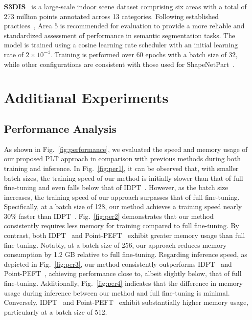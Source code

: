 \textbf{S3DIS}~\cite{armeni20163d} is a large-scale indoor scene dataset comprising six areas with a total of 273 million points annotated across 13 categories. Following established practices~\cite{dong2022autoencoders}, Area 5 is recommended for evaluation to provide a more reliable and standardized assessment of performance in semantic segmentation tasks. The model is trained using a cosine learning rate scheduler with an initial learning rate of $2 \times 10^{-4}$. Training is performed over 60 epochs with a batch size of 32, while other configurations are consistent with those used for ShapeNetPart~\cite{yi2016scalable}.


\section{Additianal Experiments}

\subsection{Performance Analysis}  
As shown in Fig.~\ref{fig:performance}, we evaluated the speed and memory usage of our proposed PLT approach in comparison with previous methods during both training and inference. In Fig.~\ref{fig:per1}, it can be observed that, with smaller batch sizes, the training speed of our method is initially slower than that of full fine-tuning and even falls below that of IDPT~\cite{zha2023instance}. However, as the batch size increases, the training speed of our approach surpasses that of full fine-tuning. Specifically, at a batch size of 128, our method achieves a training speed nearly 30\% faster than IDPT~\cite{zha2023instance}. Fig.~\ref{fig:per2} demonstrates that our method consistently requires less memory for training compared to full fine-tuning. By contrast, both IDPT~\cite{zha2023instance} and Point-PEFT~\cite{tang2024point} exhibit greater memory usage than full fine-tuning. Notably, at a batch size of 256, our approach reduces memory consumption by 1.2 GB relative to full fine-tuning. Regarding inference speed, as depicted in Fig.~\ref{fig:per3}, our method consistently outperforms IDPT~\cite{zha2023instance} and Point-PEFT~\cite{tang2024point}, achieving performance close to, albeit slightly below, that of full fine-tuning. Additionally, Fig.~\ref{fig:per4} indicates that the difference in memory usage during inference between our method and full fine-tuning is minimal. Conversely, IDPT~\cite{zha2023instance} and Point-PEFT~\cite{tang2024point} exhibit substantially higher memory usage, particularly at a batch size of 512.

